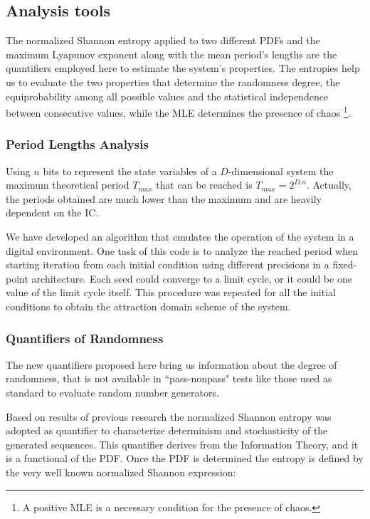 \subsection{Analysis tools}
\label{sec:quanti}

The normalized Shannon entropy applied to two different PDFs and the maximum Lyapunov exponent along with the mean period's lengths are the quantifiers employed here to estimate the system's properties. The entropies   help us to evaluate the two properties that determine the randomness degree, the equiprobability among all possible values and the statistical independence between consecutive values, while the MLE determines the presence of chaos \footnote{A positive MLE is a necessary condition for the presence of chaos.}. 
 
\subsubsection{Period Lengths Analysis}
Using $n$ bits to represent the state variables of a $D$-dimensional system the maximum theoretical period $T_{max}$ that can be reached is $T_{max}=2^{D.n}$. Actually, the periods obtained are much lower than the maximum and are heavily dependent on the IC.

We have developed an algorithm that emulates the operation of the system in a digital environment. One task of this code is to analyze the reached period when starting iteration from each initial condition using different precisions in a fixed-point architecture. Each seed could converge to a limit cycle, or it could be one value of the limit cycle itself. This procedure was repeated for all the initial conditions to obtain the attraction domain scheme of the
system.

\subsubsection{Quantifiers of Randomness}
\label{cu_ran}

The new quantifiers proposed here bring us information about the degree of randomness, that is not available in ``pass-nonpass" tests like those used as standard to evaluate random number generators.

Based on results of previous research \cite{DeMicco2008,Antonelli2016,DeMicco2011} the normalized Shannon entropy was adopted as quantifier to characterize determinism and stochasticity of the generated sequences. This quantifier derives from the Information Theory, and it is a functional of the PDF. Once the PDF is determined the entropy is defined by the very well known normalized Shannon expression:

